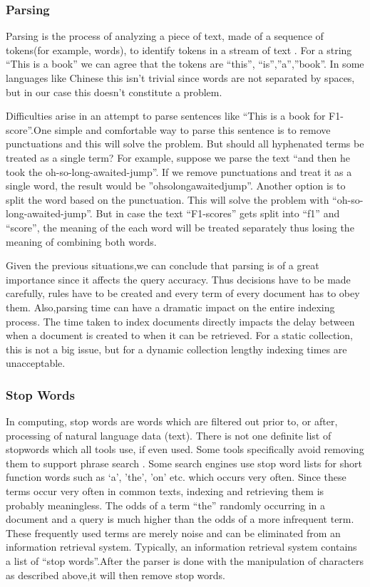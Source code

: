 \documentclass{article}
\begin{document}
\subsubsection{Parsing}
Parsing is the process of analyzing a piece of text, made of a sequence of tokens(for example, words), to identify tokens in a stream of text \cite{WikiParsing}. For a string “This is a book” we can agree that the tokens are “this”, “is”,”a”,”book”. In some languages like Chinese this isn’t trivial since words are not separated by spaces, but in our case this doesn't constitute a problem.

Difficulties arise in an attempt to parse sentences like “This is a book for F1-score”.One simple and comfortable way to parse this sentence is to remove punctuations and this will solve the problem. But should all hyphenated terms be treated as a single term? For example, suppose we parse the text “and then he took the oh-so-long-awaited-jump”. If we remove punctuations and treat it as a single word, the result would be ”ohsolongawaitedjump”. Another option is to split the word based on the punctuation. This will solve the problem with “oh-so-long-awaited-jump”. But in case the text “F1-scores” gets split into “f1” and “score”, the meaning of the each word will be treated separately thus losing the meaning of combining both words.

Given the previous situations,we can conclude that parsing is of a great importance since it affects the query accuracy. Thus decisions have to be made carefully, rules have to be created and every term of every document has to obey them. Also,parsing time can have a dramatic impact on the entire indexing process. The time taken to index documents directly impacts the delay between when a document is created to when it can be retrieved. For a static collection, this is not a big issue, but for a dynamic collection lengthy indexing times are unacceptable.


\subsubsection{Stop Words}

In computing, stop words are words which are filtered out prior to, or after, processing of natural language data (text). There is not one definite list of stopwords which all tools use, if even used. Some tools specifically avoid removing them to support phrase search \cite{WikiStopwords}. Some search engines use stop word lists for short function words such as ‘a’, ’the’, ’on’ etc. which occurs very often. Since these terms occur very often in common texts, indexing and retrieving them is probably meaningless. The odds of a term “the” randomly occurring in a document and a query is much higher than the odds of a more infrequent term. These frequently used terms are merely noise and can be eliminated from an information retrieval system. Typically, an information retrieval system contains a list of “stop words”.After the parser is done with the manipulation of characters as described above,it will then remove stop words.
\end{document}
